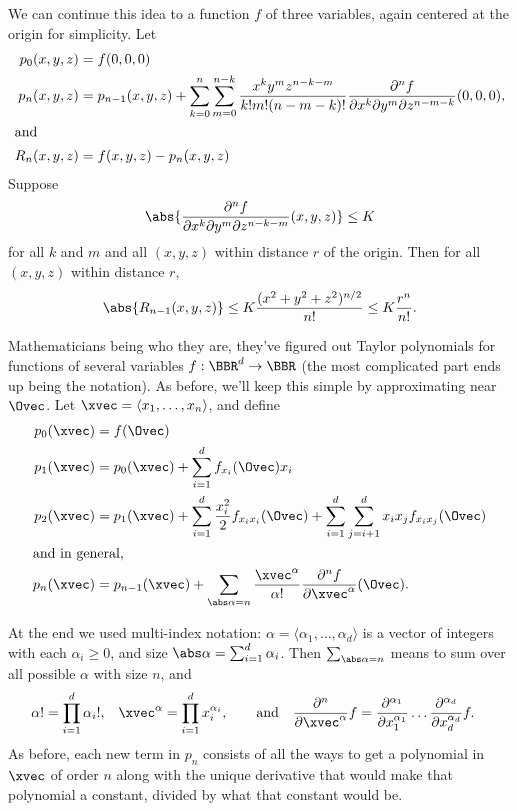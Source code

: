 We can continue this idea to a function $f$ of three variables, again centered at the origin for simplicity.  Let
\begin{align*}
 p_0(x,y,z) &= f(0,0,0) \\
 p_n(x,y,z) &= p_{n-1}(x,y,z) + \sum_{k=0}^n\sum_{m=0}^{n-k}
 \frac{x^k y^m z^{n-k-m}}{k!m!(n-m-k)!}
 \frac{\partial^n f}{\partial x^k\partial y^m\partial z^{n-m-k}}(0,0,0),\\
 \intertext{and}
 R_n(x,y,z) &= f(x,y,z)-p_n(x,y,z)
\end{align*}
Suppose
\[\abs{\frac{\partial^n f}{\partial x^k\partial y^m\partial z^{n-k-m}}(x,y,z)}\le K\]
for all $k$ and $m$ and all $(x,y,z)$ within distance $r$ of the origin. Then for all $(x,y,z)$ within distance $r$,
\[
 \abs{R_{n-1}(x,y,z)}
 \le K\frac{(x^2+y^2+z^2)^{n/2}}{n!}
 \le K\frac{r^n}{n!}.
\]

\fi

\iffalse %

Mathematicians being who they are, they've figured out Taylor polynomials for functions of several variables $f:\BBR^d\to\BBR$ (the most complicated part ends up being the notation). As before, we'll keep this simple by approximating near $\Ovec$. Let $\xvec=\langle x_1,\dotsc,x_n\rangle$, and define
\begin{align*}
 p_0(\xvec) & = f(\Ovec) \\
 p_1(\xvec) & = p_0(\xvec)+\sum_{i=1}^d f_{x_i}(\Ovec)x_i \\
 p_2(\xvec) & = p_1(\xvec)+\sum_{i=1}^d \frac{x_i^2}2f_{x_ix_i}(\Ovec)
 +\sum_{i=1}^d\sum_{j=i+1}^d x_ix_j f_{x_ix_j}(\Ovec) \\
 \intertext{and in general,}
 p_n(\xvec) & = p_{n-1}(\xvec) +
 \sum_{\abs\alpha=n}\frac{\xvec^\alpha}{\alpha!}
 \frac{\partial^n f}{\partial\xvec^\alpha}
 (\Ovec).
\end{align*}

At the end we used multi-index notation: $\alpha=\langle\alpha_1,\dotsc,\alpha_d\rangle$ is a vector of integers with each $\alpha_i\ge 0$, and size $\abs\alpha=\sum_{i=1}^d\alpha_i$. Then $\sum_{\abs\alpha=n}$ means to sum over all possible $\alpha$ with size $n$, and
\begin{align*}
 \alpha! & = \prod_{i=1}^d \alpha_i!,
 & \xvec^\alpha & = \prod_{i=1}^d x_i^{\alpha_i}, \qquad\text{and} &
 \frac{\partial^n}{\partial\xvec^\alpha}f
 & = \frac{\partial^{\alpha_1}}{\partial x_1^{\alpha_1}}
 \dotso\frac{\partial^{\alpha_d}}{\partial x_d^{\alpha_d}}f.
\end{align*}
As before, each new term in $p_n$ consists of all the ways to get a polynomial in $\xvec$ of order $n$ along with the unique derivative that would make that polynomial a constant, divided by what that constant would be.

